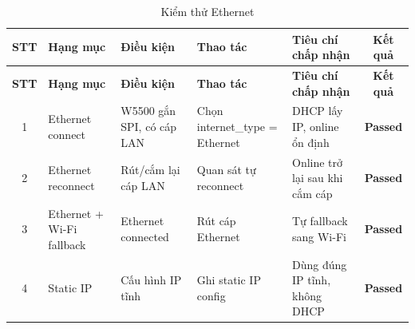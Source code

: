         \begin{longtable}{|c|p{2cm}|p{3.5cm}|p{2.5cm}|p{4cm}|c|}
            \caption{Kiểm thử Ethernet}
            \label{tab:test_ethernet} \\
            \hline
            \textbf{STT} & \textbf{Hạng mục} & \textbf{Điều kiện} & \textbf{Thao tác} & \textbf{Tiêu chí chấp nhận} & \textbf{Kết quả} \\ \hline
            \endfirsthead
        
            \hline
            \textbf{STT} & \textbf{Hạng mục} & \textbf{Điều kiện} & \textbf{Thao tác} & \textbf{Tiêu chí chấp nhận} & \textbf{Kết quả} \\ \hline
            \endhead
        
            \hline
            \endfoot
            \endlastfoot
        
            1 & Ethernet connect & W5500 gắn SPI, có cáp LAN & Chọn internet\_type = Ethernet & DHCP lấy IP, online ổn định & \textcolor{modern_blue}{\textbf{Passed}} \\ \hline
            2 & Ethernet reconnect & Rút/cắm lại cáp LAN & Quan sát tự reconnect & Online trở lại sau khi cắm cáp & \textcolor{modern_blue}{\textbf{Passed}} \\ \hline
            3 & Ethernet + Wi-Fi fallback & Ethernet connected & Rút cáp Ethernet & Tự fallback sang Wi-Fi & \textcolor{modern_blue}{\textbf{Passed}} \\ \hline
            4 & Static IP & Cấu hình IP tĩnh & Ghi static IP config & Dùng đúng IP tĩnh, không DHCP & \textcolor{modern_blue}{\textbf{Passed}} \\ \hline
        \end{longtable}
        
